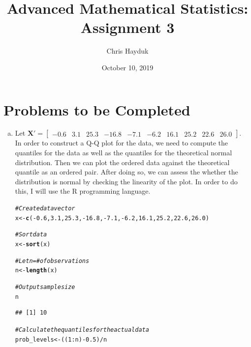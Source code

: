 \documentclass[12pt]{article}\usepackage[]{graphicx}\usepackage[]{color}
\makeatletter
\newcommand{\hlnum}[1]{\textcolor[rgb]{0.686,0.059,0.569}{#1}}%
\newcommand{\hlcom}[1]{\textcolor[rgb]{0.678,0.584,0.686}{\textit{#1}}}%
\newcommand{\hlopt}[1]{\textcolor[rgb]{0,0,0}{#1}}%
\newcommand{\hlstd}[1]{\textcolor[rgb]{0.345,0.345,0.345}{#1}}%
\newcommand{\hlkwb}[1]{\textcolor[rgb]{0.69,0.353,0.396}{#1}}%
\newcommand{\hlkwd}[1]{\textcolor[rgb]{0.737,0.353,0.396}{\textbf{#1}}}%
\newenvironment{kframe}{%
 \def\at@end@of@kframe{}%
 \ifinner\ifhmode%
  \def\at@end@of@kframe{\end{minipage}}%
  \begin{minipage}{\columnwidth}%
 \fi\fi%
 \def\FrameCommand##1{\hskip\@totalleftmargin \hskip-\fboxsep
 \colorbox{shadecolor}{##1}\hskip-\fboxsep
     \hskip-\linewidth \hskip-\@totalleftmargin \hskip\columnwidth}%
 \MakeFramed {\advance\hsize-\width
   \@totalleftmargin\z@ \linewidth\hsize
   \@setminipage}}%
 {\par\unskip\endMakeFramed%
 \at@end@of@kframe}
\newenvironment{knitrout}{}{} %
\newenvironment{problem}[2][Problem]{\begin{trivlist}
\item[\hskip \labelsep {\bfseries #1}\hskip \labelsep {\bfseries #2.}]}{\end{trivlist}}
\newcommand{\vct}{\mathbf}
\makeatother
\begin{document}
\title{Advanced Mathematical Statistics: Assignment 3}

\author{Chris Hayduk}
\date{October 10, 2019}

\maketitle



\section{Problems to be Completed}

\begin{problem}{4.23}
\end{problem}

\begin{enumerate}[a)]

\item Let $\vct{X}' = \begin{bmatrix} -0.6 & 3.1 & 25.3 & -16.8 & -7.1 & -6.2 & 16.1 & 25.2 & 22.6 & 26.0 \end{bmatrix}$.\\

In order to construct a Q-Q plot for the data, we need to compute the quantiles for the data as well as the quantiles for the theoretical normal distribution. Then we can plot the ordered data against the theoretical quantile as an ordered pair. After doing so, we can assess the whether the distribution is normal by checking the linearity of the plot. In order to do this, I will use the R programming language.

\begin{knitrout}
\color{fgcolor}\begin{kframe}
\begin{alltt}
\hlcom{#Create data vector}
\hlstd{x} \hlkwb{<-} \hlkwd{c}\hlstd{(}\hlopt{-}\hlnum{0.6}\hlstd{,} \hlnum{3.1}\hlstd{,} \hlnum{25.3}\hlstd{,} \hlopt{-}\hlnum{16.8}\hlstd{,} \hlopt{-}\hlnum{7.1}\hlstd{,} \hlopt{-}\hlnum{6.2}\hlstd{,} \hlnum{16.1}\hlstd{,} \hlnum{25.2}\hlstd{,} \hlnum{22.6}\hlstd{,} \hlnum{26.0}\hlstd{)}

\hlcom{#Sort data}
\hlstd{x} \hlkwb{<-} \hlkwd{sort}\hlstd{(x)}

\hlcom{#Let n = # of observations}
\hlstd{n} \hlkwb{<-} \hlkwd{length}\hlstd{(x)}

\hlcom{#Output sample size}
\hlstd{n}
\end{alltt}
\begin{verbatim}
## [1] 10
\end{verbatim}
\begin{alltt}
\hlcom{#Calculate the quantiles for the actual data}
\hlstd{prob_levels} \hlkwb{<-} \hlstd{((}\hlnum{1}\hlopt{:}\hlstd{n)}\hlopt{-}\hlnum{0.5}\hlstd{)}\hlopt{/}\hlstd{n}


\end{alltt}
\end{kframe}
\end{knitrout}
\end{enumerate}
\end{document}
